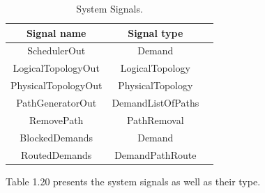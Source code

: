 \begin{table}[H]
	\centering
	\begin{tabular}{| c | c | c |}
		\hline
		 \textbf{Signal name} &  \textbf{Signal type} \\ %
		\hline
		SchedulerOut &  Demand\\ \hline
		LogicalTopologyOut &  LogicalTopology\\ \hline
		PhysicalTopologyOut & PhysicalTopology\\ \hline
		PathGeneratorOut &  DemandListOfPaths\\ \hline
		RemovePath &   PathRemoval\\ \hline
		BlockedDemands &   Demand\\ \hline
		RoutedDemands & DemandPathRoute\\ \hline
	\end{tabular}
	\caption{System Signals.}
	\label{system_signals}
\end{table}
	Table 1.20 presents the system signals as well as their type.\\ \\

